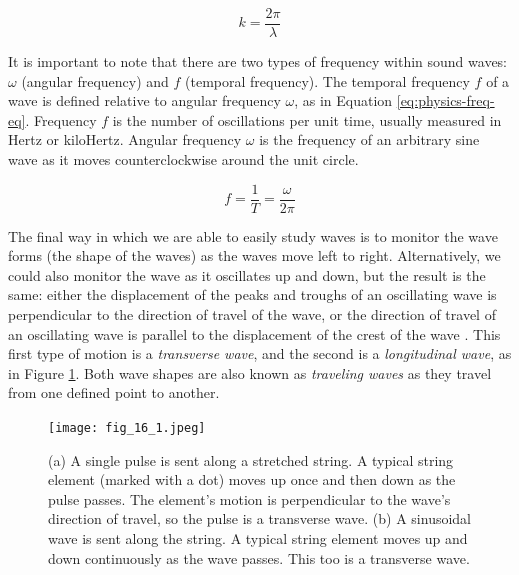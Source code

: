 \begin{equation}
	k = \frac{2\pi}{\lambda}
	\label{eq:physics-wavelength}
\end{equation}

It is important to note that there are two types of frequency within sound waves: $\omega$ (angular frequency) and $f$ (temporal frequency). The temporal frequency $f$ of a wave is defined relative to angular frequency $\omega$, as in Equation \ref{eq:physics-freq-eq}. Frequency $f$ is the number of oscillations per unit time, usually measured in Hertz or kiloHertz. Angular frequency $\omega$ is the frequency of an arbitrary sine wave as it moves counterclockwise around the unit circle.

\begin{equation}
	f = \frac{1}{T} = \frac{\omega}{2\pi}
	\label{eq:physics-freq-eq}
\end{equation}

The final way in which we are able to easily study waves is to monitor the wave forms (the shape of the waves) as the waves move left to right. Alternatively, we could also monitor the wave as it oscillates up and down, but the result is the same: either the displacement of the peaks and troughs of an oscillating wave is perpendicular to the direction of travel of the wave, or the direction of travel of an oscillating wave is parallel to the displacement of the crest of the wave \cite{Halliday_Resnick_Walker_2005}. This first type of motion is a \textit{transverse wave}, and the second is a \textit{longitudinal wave}, as in Figure \ref{fig:transverse-wave-longitudinal-wave}. Both wave shapes are also known as \textit{traveling waves} as they travel from one defined point to another.

\begin{figure}[ht]
  \centering
  \texttt{[image: fig\_16\_1.jpeg]}
  \caption{(a) A single pulse is sent along a stretched string. A typical string element (marked with a dot) moves up once and then down as the pulse passes. The element’s motion is perpendicular to the wave’s direction of travel, so the pulse is a transverse wave. (b) A sinusoidal wave is sent along the string. A typical string element moves up and down continuously as the wave passes. This too is a transverse wave.} \cite{Halliday_Resnick_Walker_2005}
  \label{fig:transverse-wave-longitudinal-wave}
\end{figure}

